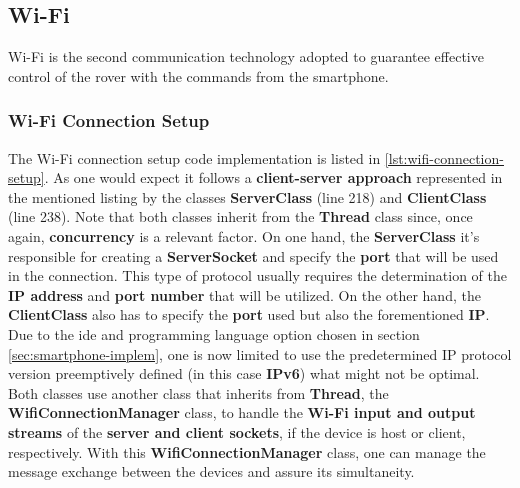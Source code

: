 \subsection{Wi-Fi}%
\label{sec:wifi-implem}
%
Wi-Fi is the second communication technology adopted to guarantee effective control of the rover with the commands from the smartphone.
%
\subsubsection{Wi-Fi Connection Setup}
\label{sec:wifi-implem-connection}
%
The Wi-Fi connection setup code implementation is listed in \ref{lst:wifi-connection-setup}. As one would expect it follows a \textbf{client-server approach} represented in the mentioned listing by the classes \textbf{ServerClass} (line 218) and \textbf{ClientClass} (line 238). Note that both classes inherit from the \textbf{Thread} class since, once again, \textbf{concurrency} is a relevant factor. On one hand, the \textbf{ServerClass} it's responsible for creating a \textbf{ServerSocket} and specify the \textbf{port} that will be used in the connection. This type of protocol usually requires the determination of the \textbf{IP address} and \textbf{port number} that will be utilized. On the other hand, the \textbf{ClientClass} also has to specify the \textbf{port} used but also the forementioned \textbf{IP}. Due to the \gls{ide} and programming language option chosen in section \ref{sec:smartphone-implem}, one is now limited to use the predetermined IP protocol version preemptively defined (in this case \textbf{IPv6}) what might not be optimal. Both classes use another class that inherits from \textbf{Thread}, the \textbf{WifiConnectionManager} class, to handle the\textbf{ Wi-Fi input and output streams} of the \textbf{server and client sockets}, if the device is host or client, respectively. With this \textbf{WifiConnectionManager} class, one can manage the message exchange between the devices and assure its simultaneity.\\
%

%
